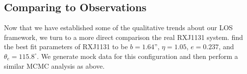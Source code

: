 \subsection{Comparing to Observations} \label{sec:observations}
Now that we have established some of the qualitative trends about our LOS framework, we turn to a more direct comparison the real RXJ1131 system. \citet{Suyu13} find the best fit parameters of RXJ1131 to be $b = 1.64$'', $\eta = 1.05$, $e = 0.237$, and $\theta_e = 115.8^{\circ}$. We generate mock data for this configuration and then perform a similar MCMC analysis as above. 